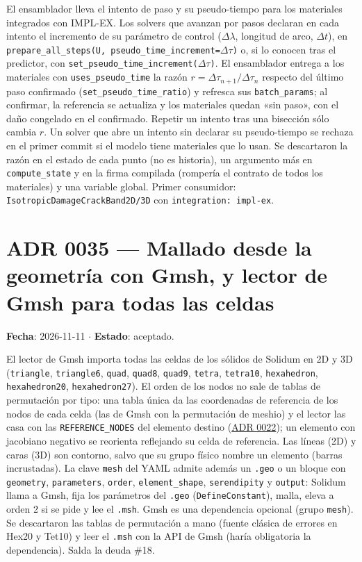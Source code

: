 \documentclass[11pt,oneside]{report}
\begin{document}
El ensamblador lleva el intento de paso y su pseudo-tiempo para los materiales integrados con IMPL-EX. Los solvers que avanzan por pasos declaran en cada intento el incremento de su parámetro de control ($\Delta\lambda$, longitud de arco, $\Delta t$), en \texttt{prepare\_\allowbreak{}all\_\allowbreak{}steps(U, pseudo\_\allowbreak{}time\_\allowbreak{}increment=\ensuremath{\Delta}\ensuremath{\tau})} o, si lo conocen tras el predictor, con \texttt{set\_\allowbreak{}pseudo\_\allowbreak{}time\_\allowbreak{}increment(\ensuremath{\Delta}\ensuremath{\tau})}. El ensamblador entrega a los materiales con \texttt{uses\_pseudo\_time} la razón $r = \Delta\tau_{n+1}/\Delta\tau_n$ respecto del último paso confirmado (\texttt{set\_\allowbreak{}pseudo\_\allowbreak{}time\_\allowbreak{}ratio}) y refresca sus \texttt{batch\_params}; al confirmar, la referencia se actualiza y los materiales quedan «sin paso», con el daño congelado en el confirmado. Repetir un intento tras una bisección sólo cambia $r$. Un solver que abre un intento sin declarar su pseudo-tiempo se rechaza en el primer commit si el modelo tiene materiales que lo usan. Se descartaron la razón en el estado de cada punto (no es historia), un argumento más en \texttt{compute\_state} y en la firma compilada (rompería el contrato de todos los materiales) y una variable global. Primer consumidor: \texttt{IsotropicDamageCrackBand2D/\allowbreak{}3D} con \texttt{integration: impl-ex}.

\section{ADR 0035 --- Mallado desde la geometría con Gmsh, y lector de Gmsh para todas las celdas}
\label{adr:0035}

\textbf{Fecha}: 2026-11-11 \ensuremath{\cdot} \textbf{Estado}: aceptado.

El lector de Gmsh importa todas las celdas de los sólidos de Solidum en 2D y 3D (\texttt{triangle}, \texttt{triangle6}, \texttt{quad}, \texttt{quad8}, \texttt{quad9}, \texttt{tetra}, \texttt{tetra10}, \texttt{hexahedron}, \texttt{hexahedron20}, \texttt{hexahedron27}). El orden de los nodos no sale de tablas de permutación por tipo: una tabla única da las coordenadas de referencia de los nodos de cada celda (las de Gmsh con la permutación de meshio) y el lector las casa con las \texttt{REFERENCE\_NODES} del elemento destino (\hyperref[adr:0022]{ADR 0022}); un elemento con jacobiano negativo se reorienta reflejando su celda de referencia. Las líneas (2D) y caras (3D) son contorno, salvo que su grupo físico nombre un elemento (barras incrustadas). La clave \texttt{mesh} del YAML admite además un \texttt{.geo} o un bloque con \texttt{geometry}, \texttt{parameters}, \texttt{order}, \texttt{element\_shape}, \texttt{serendipity} y \texttt{output}: Solidum llama a Gmsh, fija los parámetros del \texttt{.geo} (\texttt{DefineConstant}), malla, eleva a orden 2 si se pide y lee el \texttt{.msh}. Gmsh es una dependencia opcional (grupo \texttt{mesh}). Se descartaron las tablas de permutación a mano (fuente clásica de errores en Hex20 y Tet10) y leer el \texttt{.msh} con la API de Gmsh (haría obligatoria la dependencia). Salda la deuda \#18.
\end{document}
